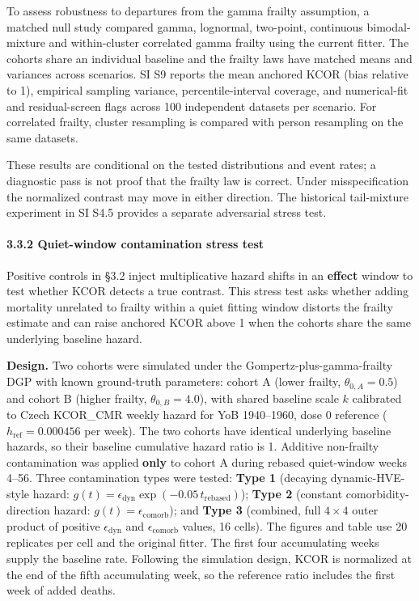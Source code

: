 \documentclass[
]{article}
\begin{document}
{\color{red} To assess robustness to departures from the gamma frailty assumption, a matched null study compared gamma, lognormal, two-point, continuous bimodal-mixture and within-cluster correlated gamma frailty using the current fitter. The cohorts share an individual baseline and the frailty laws have matched means and variances across scenarios. SI S9 reports the mean anchored KCOR (bias relative to 1), empirical sampling variance, percentile-interval coverage, and numerical-fit and residual-screen flags across 100 independent datasets per scenario. For correlated frailty, cluster resampling is compared with person resampling on the same datasets.

These results are conditional on the tested distributions and event rates; a diagnostic pass is not proof that the frailty law is correct. Under misspecification the normalized contrast may move in either direction. The historical tail-mixture experiment in SI S4.5 provides a separate adversarial stress test.}

\paragraph{3.3.2 Quiet-window contamination stress test}\label{quiet-window-contamination-stress-test}

Positive controls in §3.2 inject multiplicative hazard shifts in an \textbf{effect} window to test whether KCOR detects a true contrast. This stress test asks whether adding mortality unrelated to frailty within a quiet fitting window distorts the frailty estimate and can raise anchored KCOR above 1 when the cohorts share the same underlying baseline hazard.

\textbf{Design.} Two cohorts were simulated under the Gompertz-plus-gamma-frailty DGP with known ground-truth parameters: cohort A (lower frailty, \(\theta_{0,A}=0.5\)) and cohort B (higher frailty, \(\theta_{0,B}=4.0\)), with shared baseline scale \(k\) calibrated to Czech KCOR\_CMR weekly hazard for YoB 1940--1960, dose 0 reference (\(h_{\mathrm{ref}}=0.000456\) per week). The two cohorts have identical underlying baseline hazards, so their baseline cumulative hazard ratio is 1. Additive non-frailty contamination was applied \textbf{only} to cohort A during rebased quiet-window weeks 4--56. Three contamination types were tested: \textbf{Type 1} (decaying dynamic-HVE-style hazard: \(g(t)=\epsilon_{\mathrm{dyn}}\exp(-0.05\,t_{\mathrm{rebased}})\)); \textbf{Type 2} (constant comorbidity-direction hazard: \(g(t)=\epsilon_{\mathrm{comorb}}\)); and \textbf{Type 3} (combined, full \(4\times4\) outer product of positive \(\epsilon_{\mathrm{dyn}}\) and \(\epsilon_{\mathrm{comorb}}\) values, 16 cells). The figures and table use 20 replicates per cell and the original fitter. The first four accumulating weeks supply the baseline rate. Following the simulation design, KCOR is normalized at the end of the fifth accumulating week, so the reference ratio includes the first week of added deaths.
\end{document}
